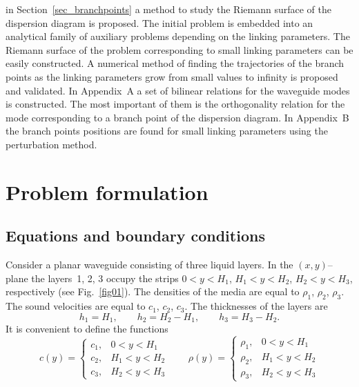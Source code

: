 \documentclass[12pt]{article}
\begin{document}
in Section~\ref{sec_branchpoints} a method to study the Riemann surface of the dispersion diagram 
is proposed. The initial problem is embedded into an analytical family of 
auxiliary problems depending on the linking parameters. The Riemann surface of the problem corresponding to small linking parameters 
can be easily constructed. A numerical method of finding the trajectories of the branch points as 
the linking parameters grow from small values to infinity is proposed and validated. 
In Appendix~A a set of bilinear relations for the waveguide modes is constructed. 
The most important of them is the orthogonality relation for the mode corresponding 
to a branch point of the dispersion diagram. In Appendix~B the branch points positions
are found for small linking parameters using the perturbation method.    
  

   
  








\section{Problem formulation}
\label{sec_formulation}

\subsection{Equations and boundary conditions}


Consider a planar waveguide consisting of three liquid layers. In the $(x,y)$--plane the 
layers~1, 2, 3 occupy the strips $0<y<H_1$, $H_1 < y < H_2$, $H_2 < y < H_3$, respectively 
(see Fig.~\ref{fig01}). 
The densities of the media are equal to $\rho_1$, $\rho_2$, $\rho_3$. The sound velocities 
are equal to $c_1$, $c_2$, $c_3$.     
The thicknesses of the layers are 
\[
h_1 = H_1, \qquad h_2 = H_2 - H_1, \qquad h_3 = H_3-H_2 . 
\]
It is convenient to define the functions
\[
c(y) = \left\{ \begin{array}{ll}
c_1, & 0 < y < H_1 \\
c_2, & H_1 < y < H_2 \\
c_3, & H_2 < y < H_3
\end{array} \right.
\qquad
\rho (y) = \left\{ \begin{array}{ll}
\rho_1, & 0 < y < H_1 \\
\rho_2, & H_1 < y < H_2 \\
\rho_3, & H_2 < y < H_3
\end{array} \right.
\] 
\end{document}
